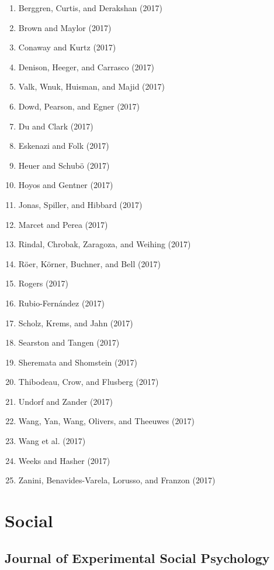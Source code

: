 \documentclass[english,man]{apa6}
\providecommand{\tightlist}{%
  \setlength{\itemsep}{0pt}\setlength{\parskip}{0pt}}
\theoremstyle{definition}
\theoremstyle{definition}
\theoremstyle{definition}
\theoremstyle{remark}
\begin{document}
\begin{enumerate}
\def\labelenumi{\arabic{enumi})}
\tightlist
\item
  Berggren, Curtis, and Derakshan (2017)
\item
  Brown and Maylor (2017)
\item
  Conaway and Kurtz (2017)
\item
  Denison, Heeger, and Carrasco (2017)
\item
  Valk, Wnuk, Huisman, and Majid (2017)
\item
  Dowd, Pearson, and Egner (2017)
\item
  Du and Clark (2017)
\item
  Eskenazi and Folk (2017)
\item
  Heuer and Schubö (2017)
\item
  Hoyos and Gentner (2017)
\item
  Jonas, Spiller, and Hibbard (2017)
\item
  Marcet and Perea (2017)
\item
  Rindal, Chrobak, Zaragoza, and Weihing (2017)
\item
  Röer, Körner, Buchner, and Bell (2017)
\item
  Rogers (2017)
\item
  Rubio-Fernández (2017)
\item
  Scholz, Krems, and Jahn (2017)
\item
  Searston and Tangen (2017)
\item
  Sheremata and Shomstein (2017)
\item
  Thibodeau, Crow, and Flusberg (2017)
\item
  Undorf and Zander (2017)
\item
  Wang, Yan, Wang, Olivers, and Theeuwes (2017)
\item
  Wang et al. (2017)
\item
  Weeks and Hasher (2017)
\item
  Zanini, Benavides-Varela, Lorusso, and Franzon (2017)
\end{enumerate}

\section{Social}\label{social}

\subsection{Journal of Experimental Social
Psychology}\label{journal-of-experimental-social-psychology}
\end{document}
